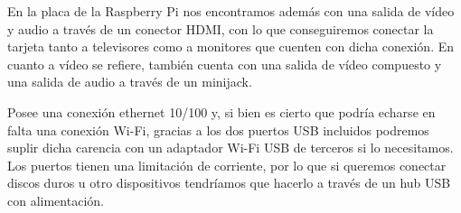 En la placa de la Raspberry Pi nos encontramos además con una salida de vídeo y audio a través de un conector HDMI, con lo que conseguiremos conectar la tarjeta tanto a televisores como a monitores que cuenten con dicha conexión. En cuanto a vídeo se refiere, también cuenta con una salida de vídeo compuesto y una salida de audio a través de un minijack.



Posee una conexión ethernet 10/100 y, si bien es cierto que podría echarse en falta una conexión Wi-Fi, gracias a los dos puertos USB incluidos podremos suplir dicha carencia con un adaptador Wi-Fi USB de terceros si lo necesitamos. Los puertos tienen una limitación de corriente, por lo que si queremos conectar discos duros u otro dispositivos tendríamos que hacerlo a través de un hub USB con alimentación.
